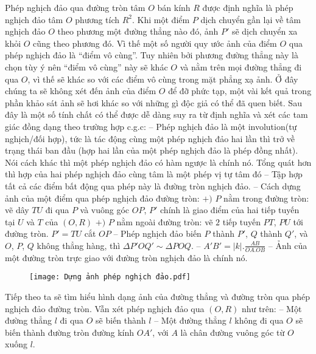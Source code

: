 \documentclass{article}
\begin{document}
	Phép nghịch đảo qua đường tròn tâm $O$ bán kính $R$ được định nghĩa là phép nghịch đảo tâm $O$ phương tích $R^2$.
	\vskip 0.1cm
	Khi một điểm $P$ dịch chuyển gần lại về tâm nghịch đảo $O$ theo phương một đường thẳng nào đó, ảnh $P'$ sẽ dịch chuyển xa khỏi $O$ cũng theo phương đó. Vì thế một số người quy ước ảnh của điểm $O$ qua phép nghịch đảo là ``điểm vô cùng''. Tuy nhiên bởi phương đường thẳng này là chọn tùy ý nên ``điểm vô cùng'' này sẽ khác $O$ và nằm trên mọi đường thẳng đi qua $O$, vì thế sẽ khác so với các điểm vô cùng trong mặt phẳng xạ ảnh. Ở đây chúng ta sẽ không xét đến ảnh của điểm $O$ để đỡ phức tạp, một vài kết quả trong phần khảo sát ảnh sẽ hơi khác so với những gì độc giả có thể đã quen biết.
	\vskip 0.1cm
	Sau đây là một số tính chất có thể được dễ dàng suy ra từ định nghĩa và xét các tam giác đồng dạng theo trường hợp c.g.c:
	\vskip 0.1cm
	-- Phép nghịch đảo là một involution(tự nghịch/đối hợp), tức là tác động cùng một phép nghịch đảo hai lần thì trở về trạng thái ban đầu (hợp hai lần của một phép nghịch đảo là phép đồng nhất). Nói cách khác thì một phép nghịch đảo có hàm ngược là chính nó.
	Tổng quát hơn thì hợp của hai phép nghịch đảo cùng tâm là một phép vị tự tâm đó 
	\vskip 0.1cm
	-- Tập hợp tất cả các điểm bất động qua phép này là đường tròn nghịch đảo.
	\vskip 0.1cm
	-- Cách dựng ảnh của một điểm qua phép nghịch đảo đường tròn:
	\vskip 0.1cm
	$+)$ $P$ nằm trong đường tròn: vẽ dây $TU$ đi qua $P$ và vuông góc $OP$, $P'$ chính là giao điểm của hai tiếp tuyến tại $U$ và $T$ của $(O, R)$
	\vskip 0.1cm
	$+)$ $P$ nằm ngoài đường tròn: vẽ $2$ tiếp tuyến $PT$, $PU$ tới đường tròn. $P' = TU$ cắt $OP$
	\vskip 0.1cm
	-- Phép nghịch đảo biến $P$ thành $P'$, $Q$ thành $Q'$, và $O$, $P$, $Q$ không thẳng hàng, thì $\Delta  P'OQ' \sim  \Delta POQ$.
	\vskip 0.1cm
	-- $A'B' = |k|. \frac{AB}{OA.OB}$
	\vskip 0.1cm
	-- Ảnh của một đường tròn trực giao với đường tròn nghịch đảo là chính nó.
	\begin{figure}[H]
		\vspace*{-5pt}
		\centering
		\captionsetup{labelformat= empty, justification=centering}
		\texttt{[image: Dựng ảnh phép nghịch đảo.pdf]}
		\vspace*{-10pt}
	\end{figure}
	Tiếp theo ta sẽ tìm hiểu hình dạng ảnh của đường thẳng và đường tròn qua phép nghịch đảo đường tròn. Vẫn xét phép nghịch đảo qua $(O, R)$ như trên: 
	\vskip 0.1cm
	-- Một đường thẳng $l$ đi qua $O$ sẽ biến thành $l$
	\vskip 0.1cm
	-- Một đường thẳng $l$ không đi qua $O$ sẽ biến thành  đường tròn đường kính $OA'$, với $A$ là chân đường vuông góc từ $O$ xuống $l$.
\end{document}
